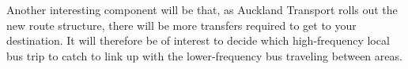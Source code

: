 \documentclass[12pt,a4paper]{article}
\begin{document}
Another interesting component will be that, as Auckland Transport rolls out the new
route structure, there will be more transfers required to get to your destination.
It will therefore be of interest to decide which high-frequency local bus trip to catch 
to link up with the lower-frequency bus traveling between areas.





















\end{document}
